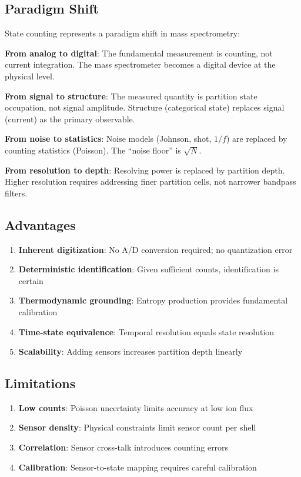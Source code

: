\documentclass[twocolumn,10pt]{article}
\begin{document}
\subsection{Paradigm Shift}

State counting represents a paradigm shift in mass spectrometry:

\textbf{From analog to digital}: The fundamental measurement is counting, not current integration. The mass spectrometer becomes a digital device at the physical level.

\textbf{From signal to structure}: The measured quantity is partition state occupation, not signal amplitude. Structure (categorical state) replaces signal (current) as the primary observable.

\textbf{From noise to statistics}: Noise models (Johnson, shot, $1/f$) are replaced by counting statistics (Poisson). The ``noise floor'' is $\sqrt{N}$.

\textbf{From resolution to depth}: Resolving power is replaced by partition depth. Higher resolution requires addressing finer partition cells, not narrower bandpass filters.

\subsection{Advantages}

\begin{enumerate}
    \item \textbf{Inherent digitization}: No A/D conversion required; no quantization error
    \item \textbf{Deterministic identification}: Given sufficient counts, identification is certain
    \item \textbf{Thermodynamic grounding}: Entropy production provides fundamental calibration
    \item \textbf{Time-state equivalence}: Temporal resolution equals state resolution
    \item \textbf{Scalability}: Adding sensors increases partition depth linearly
\end{enumerate}

\subsection{Limitations}

\begin{enumerate}
    \item \textbf{Low counts}: Poisson uncertainty limits accuracy at low ion flux
    \item \textbf{Sensor density}: Physical constraints limit sensor count per shell
    \item \textbf{Correlation}: Sensor cross-talk introduces counting errors
    \item \textbf{Calibration}: Sensor-to-state mapping requires careful calibration
\end{enumerate}
\end{document}

